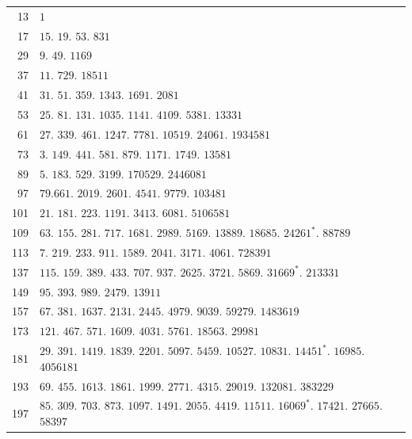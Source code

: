 \par\medskip\begingroup\small\setlength{\tabcolsep}{5pt}
\begin{longtable}{@{}r|p{\dimexpr\linewidth-38pt\relax}@{}}
13 & $1$\\
17 & $15$. $19$. $53$. $831$\\
29 & $9$. $49$. $1169$\\
37 & $11$. $729$. $18511$\\
41 & $31$. $51$. $359$. $1343$. $1691$. $2081$\\
53 & $25$. $81$. $131$. $1035$. $1141$. $4109$. $5381$. $13331$\\
61 & $27$. $339$. $461$. $1247$. $7781$. $10519$. $24061$. $1934581$\\
73 & $3$. $149$. $441$. $581$. $879$. $1171$. $1749$. $13581$\\
89 & $5$. $183$. $529$. $3199$. $170529$. $2446081$\\
97 & $79$.$661$. $2019$. $2601$. $4541$. $9779$. $103481$\\
101 & $21$. $181$. $223$. $1191$. $3413$. $6081$. $5106581$\\
109 & $63$. $155$. $281$. $717$. $1681$. $2989$. $5169$. $13889$. $18685$. $24261^{*}$. $88789$\\
113 & $7$. $219$. $233$. $911$. $1589$. $2041$. $3171$. $4061$. $728391$\\
137 & $115$. $159$. $389$. $433$. $707$. $937$. $2625$. $3721$. $5869$. $31669^{*}$. $213331$\\
149 & $95$. $393$. $989$. $2479$. $13911$\\
157 & $67$. $381$. $1637$. $2131$. $2445$. $4979$. $9039$. $59279$. $1483619$\\
173 & $121$. $467$. $571$. $1609$. $4031$. $5761$. $18563$. $29981$\\
181 & $29$. $391$. $1419$. $1839$. $2201$. $5097$. $5459$. $10527$. $10831$. $14451^{*}$. $16985$. $4056181$\\
193 & $69$. $455$. $1613$. $1861$. $1999$. $2771$. $4315$. $29019$. $132081$. $383229$\\
197 & $85$. $309$. $703$. $873$. $1097$. $1491$. $2055$. $4419$. $11511$. $16069^{*}$. $17421$. $27665$. $58397$\\
\end{longtable}\endgroup
